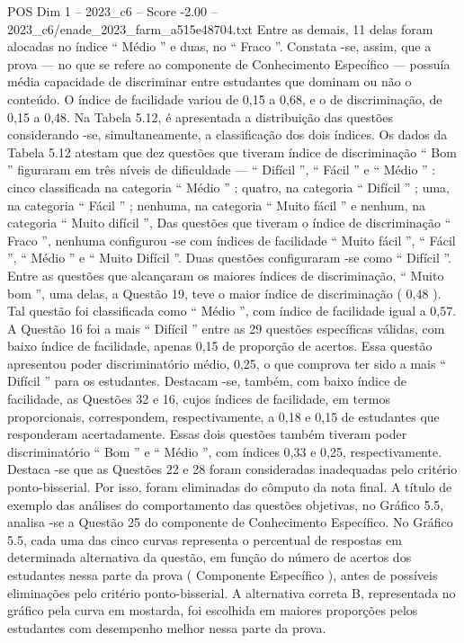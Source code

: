 \begin{textsample}{POS Dim 1 – 2023\_c6 – Score -2.00 – 2023\_c6/enade\_2023\_farm\_a515e48704.txt}
Entre as demais, 11 delas foram alocadas no índice “ Médio ” e duas, no “ Fraco ”.
Constata -se, assim, que a prova — no que se refere ao componente de Conhecimento Específico — possuía média capacidade de discriminar entre estudantes que dominam ou não o conteúdo.
O índice de facilidade variou de 0,15 a 0,68, e o de discriminação, de 0,15 a 0,48.
Na Tabela 5.12, é apresentada a distribuição das questões considerando -se, simultaneamente, a classificação dos dois índices.
Os dados da Tabela 5.12 atestam que dez questões que tiveram índice de discriminação “ Bom ” figuraram em três níveis de dificuldade — “ Difícil ”, “ Fácil ” e “ Médio ” : cinco classificada na categoria “ Médio ” ; quatro, na categoria “ Difícil ” ; uma, na categoria “ Fácil ” ; nenhuma, na categoria “ Muito fácil ” e nenhum, na categoria “ Muito difícil ”, Das questões que tiveram o índice de discriminação “ Fraco ”, nenhuma configurou -se com índices de facilidade “ Muito fácil ”, “ Fácil ”, “ Médio ” e “ Muito Difícil ”.
Duas questões configuraram -se como “ Difícil ”.
Entre as questões que alcançaram os maiores índices de discriminação, “ Muito bom ”, uma delas, a Questão 19, teve o maior índice de discriminação ( 0,48 ).
Tal questão foi classificada como “ Médio ”, com índice de facilidade igual a 0,57.
A Questão 16 foi a mais “ Difícil ” entre as 29 questões específicas válidas, com baixo índice de facilidade, apenas 0,15 de proporção de acertos.
Essa questão apresentou poder discriminatório médio, 0,25, o que comprova ter sido a mais “ Difícil ” para os estudantes.
Destacam -se, também, com baixo índice de facilidade, as Questões 32 e 16, cujos índices de facilidade, em termos proporcionais, correspondem, respectivamente, a 0,18 e 0,15 de estudantes que responderam acertadamente.
Essas dois questões também tiveram poder discriminatório “ Bom ” e “ Médio ”, com índices 0,33 e 0,25, respectivamente.
Destaca -se que as Questões 22 e 28 foram consideradas inadequadas pelo critério ponto-bisserial.
Por isso, foram eliminadas do cômputo da nota final.
A título de exemplo das análises do comportamento das questões objetivas, no Gráfico 5.5, analisa -se a Questão 25 do componente de Conhecimento Específico.
No Gráfico 5.5, cada uma das cinco curvas representa o percentual de respostas em determinada alternativa da questão, em função do número de acertos dos estudantes nessa parte da prova ( Componente Específico ), antes de possíveis eliminações pelo critério ponto-bisserial.
A alternativa correta B, representada no gráfico pela curva em mostarda, foi escolhida em maiores proporções pelos estudantes com desempenho melhor nessa parte da prova.

\end{textsample}
